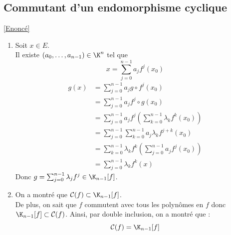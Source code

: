 \documentclass[8pt]{book}
\begin{document}
	\subsection{Commutant d'un endomorphisme cyclique}
	\label{Commutant d'un endomorphisme cyclique corrigé}
	\textcolor{blue}{\hyperref[Commutant d'un endomorphisme cyclique]{[Enoncé]}}\\
	\begin{enumerate}
		\item Soit $x\in E$.\\
		Il existe $(a_0,\dots,a_{n-1})\in\K^n$ tel que \[x=\sum_{j=0}^{n-1}a_jf^j(x_0)\]
		\begin{align*}
			g(x)&=\sum_{j=0}^{n-1}a_jg\circ f^j(x_0)\\
			&=\sum_{j=0}^{n-1}a_jf^j\circ g(x_0)\\
			&=\sum_{j=0}^{n-1}a_jf^j\left(\sum_{k=0}^{n-1}\lambda_kf^k(x_0)\right)\\
			&=\sum_{j=0}^{n-1}\sum_{k=0}^{n-1}a_j\lambda_k f^{j+k}(x_0)\\
			&=\sum_{k=0}^{n-1}\lambda_kf^k\left(\sum_{j=0}^{n-1}a_jf^j(x_0)\right)\\
			&=\sum_{j=0}^{n-1}\lambda_kf^k(x)
		\end{align*}
		Donc $g=\sum_{j=0}^{n-1}\lambda_jf^j\in\K_{n-1}[f]$.
		\item On a montré que $\mathcal{C}(f)\subset \K_{n-1}[f]$.\\
		De plus, on sait que $f$ commutent avec tous les polynômes en $f$ donc $\K_{n-1}[f]\subset \mathcal{C}(f)$.
		Ainsi, par double inclusion, on a montré que :
		\[\mathcal{C}(f)=\K_{n-1}[f]\]
	\end{enumerate}
\end{document}

